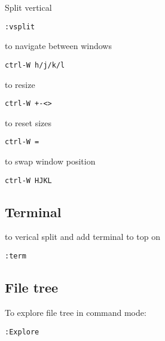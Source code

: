 Split vertical
\begin{verbatim}
:vsplit
\end{verbatim}


to navigate between windows
\begin{verbatim}
ctrl-W h/j/k/l
\end{verbatim}

to resize
\begin{verbatim}
ctrl-W +-<>
\end{verbatim}

to reset sizes
\begin{verbatim}
ctrl-W =
\end{verbatim}

to swap window position
\begin{verbatim}
ctrl-W HJKL
\end{verbatim}


\subsection{Terminal}

to verical split and add terminal to top on
\begin{verbatim}
:term
\end{verbatim}


\subsection{File tree}

To explore file tree in command mode:
\begin{verbatim}
:Explore
\end{verbatim}

